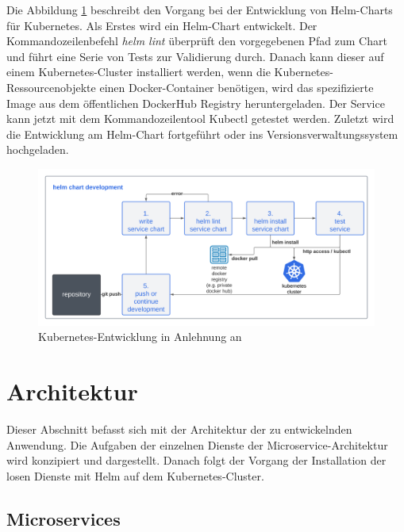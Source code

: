 Die Abbildung \ref{fig:DevWorkflowKubernetes} beschreibt den Vorgang bei der Entwicklung von Helm-Charts für Kubernetes.
Als Erstes wird ein Helm-Chart entwickelt.
Der Kommandozeilenbefehl \textit{helm lint} überprüft den vorgegebenen Pfad zum Chart und führt eine Serie von Tests zur Validierung durch.
Danach kann dieser auf einem Kubernetes-Cluster installiert werden, 
wenn die Kubernetes-Ressourcenobjekte einen Docker-Container benötigen,
wird das spezifizierte Image aus dem öffentlichen DockerHub Registry heruntergeladen.
Der Service kann jetzt mit dem Kommandozeilentool Kubectl getestet werden.
Zuletzt wird die Entwicklung am Helm-Chart fortgeführt oder ins Versionsverwaltungssystem hochgeladen.


\begin{figure}[!htb]
    \centering
    \includegraphics[width=1.0\columnwidth]{images/DevWorkflowKubernetes.png}
    \caption{Kubernetes-Entwicklung in Anlehnung an \cite{dockerappsworkflow}}
    \label{fig:DevWorkflowKubernetes}
\end{figure}


\newpage
\section{Architektur}
Dieser Abschnitt befasst sich mit der Architektur der zu entwickelnden Anwendung.
Die Aufgaben der einzelnen Dienste der Microservice-Architektur wird konzipiert und dargestellt.
Danach folgt der Vorgang der Installation der losen Dienste mit Helm auf dem Kubernetes-Cluster.



\subsection{Microservices}

